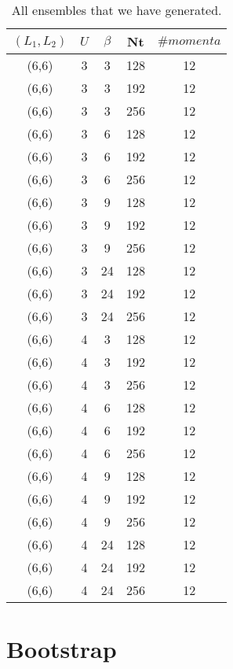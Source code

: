 \begin{table}[h]
  \centering
  \begin{tabular}{ccccc}
      $(L_1,L_2)$ & $U$ & $\beta$ & Nt & $\#momenta$ \\
      \hline
      (6,6) & 3 & 3 & 128 & 12
      \\
      (6,6) & 3 & 3 & 192 & 12
      \\
      (6,6) & 3 & 3 & 256 & 12
      \\
      (6,6) & 3 & 6 & 128 & 12
      \\
      (6,6) & 3 & 6 & 192 & 12
      \\
      (6,6) & 3 & 6 & 256 & 12
      \\
      (6,6) & 3 & 9 & 128 & 12
      \\
      (6,6) & 3 & 9 & 192 & 12
      \\
      (6,6) & 3 & 9 & 256 & 12
      \\
      (6,6) & 3 & 24 & 128 & 12
      \\
      (6,6) & 3 & 24 & 192 & 12
      \\
      (6,6) & 3 & 24 & 256 & 12
      \\
      \hline
      (6,6) & 4 & 3 & 128 & 12
      \\
      (6,6) & 4 & 3 & 192 & 12
      \\
      (6,6) & 4 & 3 & 256 & 12
      \\
      (6,6) & 4 & 6 & 128 & 12
      \\
      (6,6) & 4 & 6 & 192 & 12
      \\
      (6,6) & 4 & 6 & 256 & 12
      \\
      (6,6) & 4 & 9 & 128 & 12
      \\
      (6,6) & 4 & 9 & 192 & 12
      \\
      (6,6) & 4 & 9 & 256 & 12
      \\
      (6,6) & 4 & 24 & 128 & 12
      \\
      (6,6) & 4 & 24 & 192 & 12
      \\
      (6,6) & 4 & 24 & 256 & 12
      \\
  \end{tabular}
  \caption{All ensembles that we have generated.}
  \label{tab:all_ensembles}
\end{table}

\section{Bootstrap}
\label{app:bootstrap}

